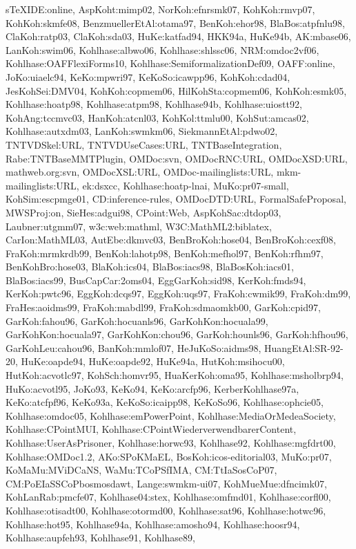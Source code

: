 {sTeXIDE:online,
AspKoht:mimp02,
NorKoh:efnrsmk07,
KohKoh:rmvp07,
KohKoh:skmfe08,
BenzmuellerEtAl:otama97,
BenKoh:ehor98,
BlaBos:atpfnlu98,
ClaKoh:ratp03,
ClaKoh:sda03,
HuKe:katfad94,
HKK94a,
HuKe94b,
AK:mbase06,
LanKoh:swim06,
Kohlhase:albwo06,
Kohlhase:shlssc06,
NRM:omdoc2vf06,
Kohlhase:OAFFlexiForms10,
Kohlhase:SemiformalizationDef09,
OAFF:online,
JoKo:uiaelc94,
KeKo:mpwri97,
KeKoSo:icawpp96,
KohKoh:cdad04,
JesKohSei:DMV04,
KohKoh:copmem06,
HilKohSta:copmem06,
KohKoh:esmk05,
Kohlhase:hoatp98,
Kohlhase:atpm98,
Kohlhase94b,
Kohlhase:uiostt92,
KohAng:tccmvc03,
HanKoh:atcnl03,
KohKol:ttmlu00,
KohSut:amcas02,
Kohlhase:autxdm03,
LanKoh:swmkm06,
SiekmannEtAl:pdwo02,
TNTVDSkel:URL,
TNTVDUseCases:URL,
TNTBaseIntegration,
Rabe:TNTBaseMMTPlugin,
OMDoc:svn,
OMDocRNC:URL,
OMDocXSD:URL,
mathweb.org:svn,
OMDocXSL:URL,
OMDoc-mailinglists:URL,
mkm-mailinglists:URL,
ek:dsxcc,
Kohlhase:hoatp-lnai,
MuKo:pr07-small,
KohSim:escpmge01,
CD:inference-rules,
OMDocDTD:URL,
FormalSafeProposal,
MWSProj:on,
SieHes:adgui98,
CPoint:Web,
AspKohSac:dtdop03,
Laubner:utgmm07,
w3c:web:mathml,
W3C:MathML2:biblatex,
CarIon:MathML03,
AutEbe:dkmvc03,
BenBroKoh:hose04,
BenBroKoh:cexf08,
FraKoh:mrmkrdb99,
BenKoh:lahotp98,
BenKoh:mefhol97,
BenKoh:rfhm97,
BenKohBro:hose03,
BlaKoh:ics04,
BlaBos:iacs98,
BlaBosKoh:iacs01,
BlaBos:iacs99,
BusCapCar:2oms04,
EggGarKoh:sid98,
KerKoh:fmds94,
KerKoh:pwtc96,
EggKoh:dcqs97,
EggKoh:uqs97,
FraKoh:cwmik99,
FraKoh:dm99,
FraHes:aoidms99,
FraKoh:mabdl99,
FraKoh:sdmaomkb00,
GarKoh:cpid97,
GarKoh:fahou96,
GarKoh:hocuanls96,
GarKohKon:hocuala99,
GarKohKon:hocuala97,
GarKohKon:chou96,
GarKoh:hounls96,
GarKoh:hfhou96,
GarKohLeu:cahou96,
BanKoh:mmlof07,
HeJuKoSo:aidms98,
HuangEtAl:SR-92-20,
HuKe:oapde94,
HuKe:oapde92,
HuKe94a,
HutKoh:msihocu00,
HutKoh:acvotlc97,
KohSch:homvr95,
HuaKerKoh:oma95,
Kohlhase:msholbrp94,
HuKo:acvotl95,
JoKo93,
KeKo94,
KeKo:arcfp96,
KerberKohlhase97a,
KeKo:atcfpf96,
KeKo93a,
KeKoSo:icaipp98,
KeKoSo96,
Kohlhase:ophcie05,
Kohlhase:omdoc05,
Kohlhase:emPowerPoint,
Kohlhase:MediaOrMedeaSociety,
Kohlhase:CPointMUI,
Kohlhase:CPointWiederverwendbarerContent,
Kohlhase:UserAsPrisoner,
Kohlhase:horwc93,
Kohlhase92,
Kohlhase:mgfdrt00,
Kohlhase:OMDoc1.2,
AKo:SPoKMaEL,
BosKoh:icos-editorial03,
MuKo:pr07,
KoMaMu:MViDCaNS,
WaMu:TCoPSfIMA,
CM:TtIaSosCoP07,
CM:PoEIaSSCoPbosmosdawt,
Lange:swmkm-ui07,
KohMueMue:dfncimk07,
KohLanRab:pmcfe07,
Kohlhase04:stex,
Kohlhase:omfmd01,
Kohlhase:corfl00,
Kohlhase:otisadt00,
Kohlhase:otormd00,
Kohlhase:sat96,
Kohlhase:hotwc96,
Kohlhase:hot95,
Kohlhase94a,
Kohlhase:amosho94,
Kohlhase:hoosr94,
Kohlhase:aupfeh93,
Kohlhase91,
Kohlhase89,
}
